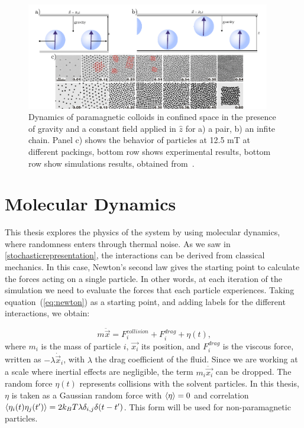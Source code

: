 \begin{figure}
  \begin{center}
    \includegraphics[width=0.95\textwidth]{figures/colloidsdynamics2.pdf}
  \end{center}
  \caption[Dinamycs of paramagnetic colloids in a confined space.]{Dynamics of paramagnetic colloids in confined space in the presence of gravity and a constant field applied in $\hat{z}$ for a) a pair, b) an infite chain. Panel c) shows the behavior of particles at 12.5 mT at different packings, bottom row shows experimental results, bottom row show simulations results, obtained from~\cite{osterman2007observation}.}\label{fig:}
\end{figure}

\section{Molecular Dynamics}
This thesis explores the physics of the system by using molecular dynamics, where randomness enters through thermal noise. As we saw in \ref{stochasticrepresentation}, the interactions can be derived from classical mechanics. In this case, Newton’s second law gives the starting point to calculate the forces acting on a single particle. In other words, at each iteration of the simulation we need to evaluate the forces that each particle experiences. Taking equation~(\ref{eq:newton}) as a starting point, and adding labels for the different interactions, we obtain:

\begin{equation}
  m\ddot{\vec{x}} = F^{collision}_i + F^{drag}_i + \eta(t)\text{,}
  \label{eq:langevinratchet}
\end{equation}
where $m_i$ is the mass of particle $i$, $\vec{x_i}$ its position, and $F^{drag}_i$ is the viscous force, written as $-\lambda \dot{\vec{x}}_i$, with $\lambda$ the drag coefficient of the fluid. Since we are working at a scale where inertial effects are negligible, the term $m_i\ddot{\vec{x_i}}$ can be dropped. The random force $\eta(t)$ represents collisions with the solvent particles. In this thesis, $\eta$ is taken as a Gaussian random force with $\expval{\eta} = 0$ and correlation $\expval{\eta_i(t)\eta_j(t')} = 2k_B T \lambda \delta_{i,j}\delta(t-t')$. This form will be used for non-paramagnetic particles.

